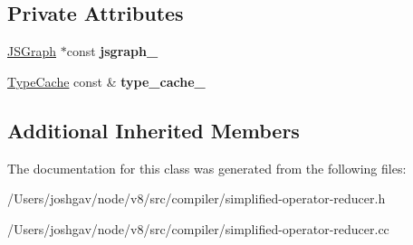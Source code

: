 \subsection*{Private Attributes}
\begin{DoxyCompactItemize}
\item 
\hyperlink{classv8_1_1internal_1_1compiler_1_1_j_s_graph}{J\+S\+Graph} $\ast$const {\bfseries jsgraph\+\_\+}\hypertarget{classv8_1_1internal_1_1compiler_1_1_simplified_operator_reducer_a1b3a05cbfd59b478ab197fe218dc909f}{}\label{classv8_1_1internal_1_1compiler_1_1_simplified_operator_reducer_a1b3a05cbfd59b478ab197fe218dc909f}

\item 
\hyperlink{classv8_1_1internal_1_1_type_cache}{Type\+Cache} const \& {\bfseries type\+\_\+cache\+\_\+}\hypertarget{classv8_1_1internal_1_1compiler_1_1_simplified_operator_reducer_ab8800b1c47797b00c6a7c3e67abed3c5}{}\label{classv8_1_1internal_1_1compiler_1_1_simplified_operator_reducer_ab8800b1c47797b00c6a7c3e67abed3c5}

\end{DoxyCompactItemize}
\subsection*{Additional Inherited Members}


The documentation for this class was generated from the following files\+:\begin{DoxyCompactItemize}
\item 
/\+Users/joshgav/node/v8/src/compiler/simplified-\/operator-\/reducer.\+h\item 
/\+Users/joshgav/node/v8/src/compiler/simplified-\/operator-\/reducer.\+cc\end{DoxyCompactItemize}

